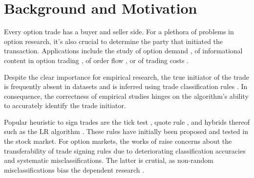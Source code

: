 

\section{Background and Motivation}

Every option trade has a buyer and seller side. For a plethora of problems in option research, it’s also crucial to determine the party that initiated the transaction. Applications include the study of option demand \autocite[][]{garleanuDemandBasedOptionPricing2009}, of informational content in option trading \autocites[][]{huDoesOptionTrading2014}[][]{panInformationOptionVolume2006}[][]{caoInformationalContentOption2005}, of order flow \autocite[][]{muravyevOrderFlowExpected2016}, or of trading costs \autocite[][]{muravyevOptionsTradingCosts2020}. 

Despite the clear importance for empirical research, the true initiator of the trade is frequently absent in datasets and is inferred using trade classification rules \autocite[][]{easleyOptionVolumeStock1998}. In consequence, the correctness of empirical studies hinges on the algorithm's ability to accurately identify the trade initiator.

Popular heuristic to sign trades are the tick test \autocite[][]{hasbrouckTradesQuotesInventories1988}, quote rule \autocite[][]{harrisDayEndTransactionPrice1989}, and hybrids thereof such as the \gls{LR} algorithm \autocite[][]{leeInferringTradeDirection1991}. These rules have initially been proposed and tested in the stock market. For option markets, the works of \textcites[][]{savickasInferringDirectionOption2003}[][]{grauerOptionTradeClassification2022} raise concerns about the transferability of trade signing rules due to deteriorating classification accuracies and systematic misclassifications. The latter is crutial, as non-random misclassifications bias the dependent research \autocites[][]{odders-whiteOccurrenceConsequencesInaccurate2000}[][]{theissenTestAccuracyLee2001}.

